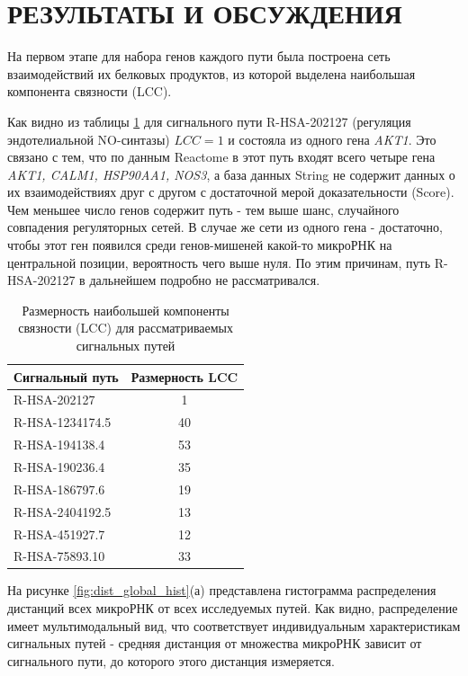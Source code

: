 \section{РЕЗУЛЬТАТЫ И ОБСУЖДЕНИЯ}

На первом этапе для набора генов каждого пути была построена сеть взаимодействий их белковых продуктов, из которой выделена наибольшая компонента связности (LCC).

Как видно из таблицы \ref{tab:path_lcc_size} для сигнального пути R-HSA-202127 (регуляция эндотелиальной NO-синтазы) $LCC = 1$ и состояла из одного гена \textit{AKT1}. Это связано с тем, что по данным Reactome в этот путь входят всего четыре гена \textit{AKT1, CALM1, HSP90AA1, NOS3}, а база данных String не содержит данных о их взаимодействиях друг с другом с достаточной мерой доказательности (Score). Чем меньшее число генов содержит путь - тем выше шанс, случайного совпадения регуляторных сетей. В случае же сети из одного гена - достаточно, чтобы этот ген появился среди генов-мишеней какой-то микроРНК на центральной позиции, вероятность чего выше нуля. По этим причинам, путь R-HSA-202127 в дальнейшем подробно не рассматривался.

\begin{table}[H]
    \centering
    \caption{Размерность наибольшей компоненты связности (LCC) для рассматриваемых сигнальных путей}
    \label{tab:path_lcc_size}
    \begin{tabular}{|l|c|}
        \hline
        \textbf{Сигнальный путь} & \textbf{Размерность LCC} \\
        \hline
        R-HSA-202127   & 1  \\
        R-HSA-1234174.5 & 40 \\
        R-HSA-194138.4 & 53 \\
        R-HSA-190236.4 & 35 \\
        R-HSA-186797.6 & 19 \\
        R-HSA-2404192.5 & 13 \\
        R-HSA-451927.7 & 12 \\
        R-HSA-75893.10 & 33 \\
        \hline
    \end{tabular}
\end{table}

На рисунке \ref{fig:dist_global_hist}(а) представлена гистограмма распределения дистанций всех микроРНК от всех исследуемых путей. Как видно, распределение имеет мультимодальный вид, что соответствует индивидуальным характеристикам сигнальных путей - средняя дистанция от множества микроРНК зависит от сигнального пути, до которого этого дистанция измеряется.

